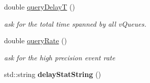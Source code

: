 \begin{DoxyCompactItemize}
\mbox{\label{classev_1_1vReadPort_ab84604a7b938a15a67c7db82d1bc82ac}} 
double \hyperlink{classev_1_1vReadPort_ab84604a7b938a15a67c7db82d1bc82ac}{query\+DelayT} ()
\begin{DoxyCompactList}\small\item\em ask for the total time spanned by all v\+Queues. \end{DoxyCompactList}\item 
\mbox{\label{classev_1_1vReadPort_af78cee18124aa9f6729aed6b8de529a5}} 
double \hyperlink{classev_1_1vReadPort_af78cee18124aa9f6729aed6b8de529a5}{query\+Rate} ()
\begin{DoxyCompactList}\small\item\em ask for the high precision event rate \end{DoxyCompactList}\item 
\mbox{\label{classev_1_1vReadPort_abfafe13fd97b9a2f86b0c16f9f77f640}} 
std\+::string {\bfseries delay\+Stat\+String} ()
\end{DoxyCompactItemize}
